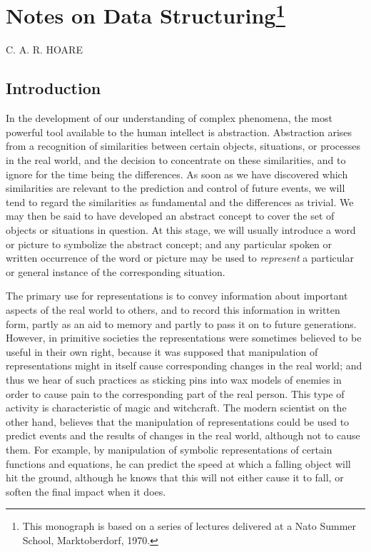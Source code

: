 \chapter[Notes on Data Structuring]{Notes on Data Structuring\footnote{This monograph is based on a series of lectures delivered at a Nato Summer School, Marktoberdorf, 1970.}}

{
	\noindent
	\scshape\hfill\scriptsize C. A. R. HOARE\hfill
}
\renewcommand{\leftmark}{\normalfont\scriptsize\hfill C. A. R. HOARE\hfill}
\medskip

\section{Introduction}

In the development of our understanding of complex phenomena, the most powerful tool available to the human intellect is abstraction. Abstraction arises from a recognition of similarities between certain objects, situations, or processes in the real world, and the decision to concentrate on these similarities, and to ignore for the time being the differences. As soon as we have discovered which similarities are relevant to the prediction and control of future events, we will tend to regard the similarities as fundamental and the differences as trivial. We may then be said to have developed an abstract concept to cover the set of objects or situations in question. At this stage, we will usually introduce a word or picture to symbolize the abstract concept; and any particular spoken or written occurrence of the word or picture may be used to \textit{represent} a particular or general instance of the corresponding situation.

The primary use for representations is to convey information about important aspects of the real world to others, and to record this information in written form, partly as an aid to memory and partly to pass it on to future generations. However, in primitive societies the representations were sometimes believed to be useful in their own right, because it was supposed that manipulation of representations might in itself cause corresponding changes in the real world; and thus we hear of such practices as sticking pins into wax models of enemies in order to cause pain to the corresponding part of the real person. This type of activity is characteristic of magic and witchcraft. The modern scientist on the other hand, believes that the manipulation of representations could be used to predict events and the results of changes in the real world, although not to cause them. For example, by manipulation of symbolic representations of certain functions and equations, he can predict the speed at which a falling object will hit the ground, although he knows that this will not either cause it to fall, or soften the final impact when it does.

